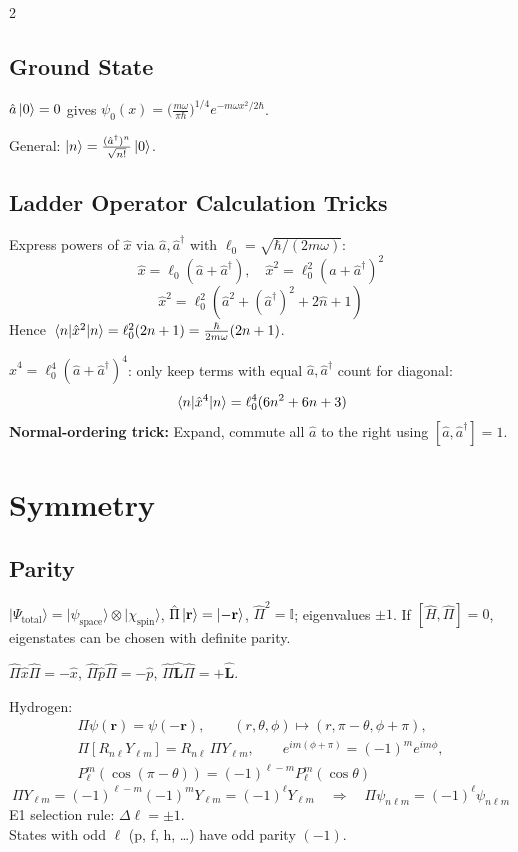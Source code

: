 \documentclass[9pt,a4paper]{article} %
\newcommand{\Hhat}{\hat{H}}
\newcommand{\phat}{\hat{p}}
\newcommand{\xhat}{\hat{x}}
\newcommand{\aop}{\hat{a}}
\newcommand{\adop}{\hat{a}^\dagger}
\newcommand{\Lop}{\hat{\mathbf{L}}}
\newcommand{\Id}{\mathbb{I}}
\begin{document}
\begin{multicols}{2}
\subsection{Ground State}
$\aop\ket{0}=0$ gives $\psi_0(x)=\bigl(\frac{m\omega}{\pi\hbar}\bigr)^{1/4}e^{-m\omega x^2/2\hbar}$.

General: $\ket{n}=\frac{(\adop)^n}{\sqrt{n!}}\ket{0}$.

\subsection{Ladder Operator Calculation Tricks}
{\footnotesize
Express powers of $\xhat$ via $\aop,\adop$ with $\ell_0=\sqrt{\hbar/(2m\omega)}$:
\[
\xhat=\ell_0(\aop+\adop),\quad \xhat^2=\ell_0^2(\aop+\adop)^2
\]
\[
\xhat^2 =\ell_0^2(\aop^2+(\adop)^2+2\hat{n}+1)
\]
Hence $\ev{\xhat^2}{n}=\ell_0^2(2n+1)=\frac{\hbar}{2m\omega}(2n+1)$.

$\xhat^4=\ell_0^4(\aop+\adop)^4$: only keep terms with equal $\aop,\adop$ count for diagonal:
\[
\ev{\xhat^4}{n}=\ell_0^4(6n^2+6n+3)
\]
\textbf{Normal-ordering trick:} Expand, commute all $\aop$ to the right using $[\aop,\adop]=1$.
}

\section{Symmetry}

\subsection{Parity}
$|\Psi_{\text{total}}\rangle = |\psi_{\text{space}}\rangle \otimes |\chi_{\text{spin}}\rangle$,\quad
$\hat{\Pi}\ket{\mathbf{r}}=\ket{-\mathbf{r}}$, $\hat{\Pi}^2=\Id$; eigenvalues $\pm 1$.
If $[\Hhat,\hat{\Pi}]=0$, eigenstates can be chosen with definite parity.

$\hat{\Pi}\xhat\hat{\Pi}=-\xhat$, $\hat{\Pi}\phat\hat{\Pi}=-\phat$, $\hat{\Pi}\Lop\hat{\Pi}=+\Lop$.

Hydrogen:
\begin{gather*}
\Pi\psi(\mathbf r)=\psi(-\mathbf r),\qquad (r,\theta,\phi)\mapsto(r,\pi-\theta,\phi+\pi),\\
\Pi[R_{n\ell}Y_{\ell m}]=R_{n\ell}\,\Pi Y_{\ell m},\qquad e^{im(\phi+\pi)}=(-1)^m e^{im\phi},\\
P_{\ell}^m(\cos(\pi-\theta))=(-1)^{\ell-m}P_{\ell}^m(\cos\theta)
\end{gather*}
\[\Pi Y_{\ell m}=(-1)^{\ell-m}(-1)^m Y_{\ell m}=(-1)^\ell Y_{\ell m}\quad\Rightarrow\quad
\Pi\psi_{n\ell m}=(-1)^\ell\psi_{n\ell m}\]
E1 selection rule: $\Delta\ell=\pm 1$.
\\
States with odd $\ell$ (p, f, h, \dots) have odd parity $(-1)$.


\end{multicols}
\end{document}
